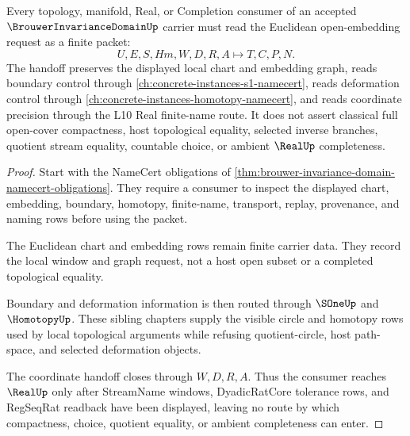 \begin{theorem}
\label{thm:brouwer-invariance-domain-euclidean-open-embedding-handoff}
Every topology, manifold, Real, or Completion consumer of an accepted $\BrouwerInvarianceDomainUp$ carrier must read the Euclidean open-embedding request as a finite packet:
$$
U,E,S,Hm,W,D,R,A \longmapsto T,C,P,N .
$$
The handoff preserves the displayed local chart and embedding graph, reads boundary control through \autoref{ch:concrete-instances-s1-namecert}, reads deformation control through \autoref{ch:concrete-instances-homotopy-namecert}, and reads coordinate precision through the L10 Real finite-name route. It does not assert classical full open-cover compactness, host topological equality, selected inverse branches, quotient stream equality, countable choice, or ambient $\RealUp$ completeness.
\end{theorem}
\begin{proof}
Start with the NameCert obligations of \autoref{thm:brouwer-invariance-domain-namecert-obligations}. They require a consumer to inspect the displayed chart, embedding, boundary, homotopy, finite-name, transport, replay, provenance, and naming rows before using the packet.

The Euclidean chart and embedding rows remain finite carrier data. They record the local window and graph request, not a host open subset or a completed topological equality.

Boundary and deformation information is then routed through $\SOneUp$ and $\HomotopyUp$. These sibling chapters supply the visible circle and homotopy rows used by local topological arguments while refusing quotient-circle, host path-space, and selected deformation objects.

The coordinate handoff closes through $W,D,R,A$. Thus the consumer reaches $\RealUp$ only after StreamName windows, DyadicRatCore tolerance rows, and RegSeqRat readback have been displayed, leaving no route by which compactness, choice, quotient equality, or ambient completeness can enter.
\end{proof}


